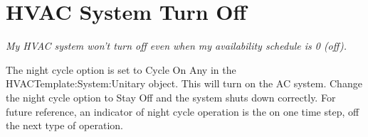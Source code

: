 \section{HVAC System Turn Off}\label{hvac-system-turn-off}

\emph{My HVAC system won't turn off even when my availability schedule is 0 (off).}

The night cycle option is set to Cycle On Any in the HVACTemplate:System:Unitary object. This will turn on the AC system. Change the night cycle option to Stay Off and the system shuts down correctly. For future reference, an indicator of night cycle operation is the on one time step, off the next type of operation.
